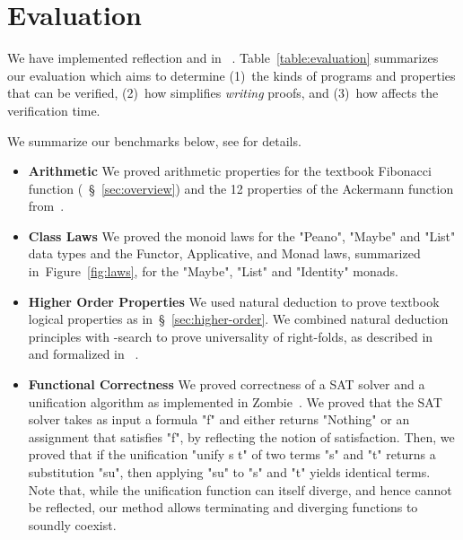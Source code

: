 \section{Evaluation}\label{sec:evaluation}


%
We have implemented reflection and \pbesym
in \toolname~\cite{Vazou14}.
%
Table~\ref{table:evaluation} summarizes our
evaluation which aims to determine
%
(1)~the kinds of programs and properties that can be verified,
%
(2)~how \pbesym simplifies \emph{writing} proofs, and
%
(3)~how \pbesym affects the verification time.


%
%
We summarize our benchmarks below,
see \citep{appendix} for details.
%
\begin{itemize}[leftmargin=*]
%
\item\textbf{Arithmetic}
We proved arithmetic properties for the textbook
Fibonacci function (\cf~\S~\ref{sec:overview})
and the 12 properties of the Ackermann function
from~\cite{ackermann}.
%
\item\textbf{Class Laws}
%
We proved the monoid laws for the "Peano",
"Maybe" and "List" data types and the Functor,
Applicative, and Monad laws, summarized
in~Figure~\ref{fig:laws}, for the "Maybe",
"List" and "Identity" monads.
%
\item\textbf{Higher Order Properties}
%
We used natural deduction to prove textbook
logical properties as in~\S~\ref{sec:higher-order}.
%
%
We combined natural deduction principles with
\pbesym-search to
prove universality of right-folds, as
described in~\citep{foldrHutton} and
formalized in \agda~\citep{agdaequational}.
%
\item\textbf{Functional Correctness}
%
We proved correctness of a SAT solver
and a unification algorithm as implemented
in Zombie~\citep{Zombie}.
%
We proved that the SAT solver takes as
input a formula "f" and either returns "Nothing"
or an assignment that satisfies "f",
by reflecting the notion of satisfaction.
%
Then, we proved that if the
unification "unify s t" of two terms
"s" and "t" returns a substitution
"su", then applying "su" to "s" and "t"
yields identical terms.
%
Note that, while the unification function can itself
diverge, and hence cannot be reflected, our method
allows terminating and diverging functions
to soundly coexist.


\end{itemize}
